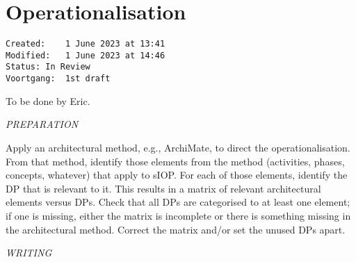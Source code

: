 \documentclass[sort&compress,preprint,3p,authoryear,twocolumn]{elsarticle}
\theoremstyle{break}			%
\begin{document}
\section{Operationalisation}\label{operationalisation}

\begin{verbatim}
Created:    1 June 2023 at 13:41
Modified:   1 June 2023 at 14:46
Status: In Review
Voortgang:  1st draft
\end{verbatim}

To be done by Eric.

\emph{PREPARATION}

Apply an architectural method, e.g., ArchiMate, to direct the
operationalisation. From that method, identify those elements from the
method (activities, phases, concepts, whatever) that apply to sIOP. For
each of those elements, identify the DP that is relevant to it. This
results in a matrix of relevant architectural elements versus DPs. Check
that all DPs are categorised to at least one element; if one is missing,
either the matrix is incomplete or there is something missing in the
architectural method. Correct the matrix and/or set the unused DPs
apart.

\emph{WRITING}
\end{document}
